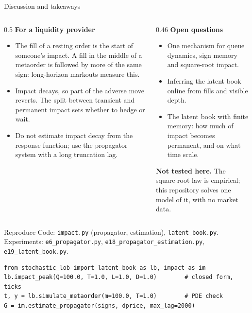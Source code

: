 \documentclass[aspectratio=169,10pt]{beamer}
\begin{document}
\begin{frame}{Discussion and takeaways}
  \small
  \begin{columns}[T]
    \begin{column}{0.5\textwidth}
      \textbf{For a liquidity provider}
      \begin{itemize}
        \item The fill of a resting order is the start of someone's impact. A fill in the middle of a metaorder is followed by more of the same sign: long-horizon markouts measure this.
        \item Impact decays, so part of the adverse move reverts. The split between transient and permanent impact sets whether to hedge or wait.
        \item Do not estimate impact decay from the response function; use the propagator system with a long truncation lag.
      \end{itemize}
    \end{column}
    \begin{column}{0.46\textwidth}
      \textbf{Open questions}
      \begin{itemize}
        \item One mechanism for queue dynamics, sign memory and square-root impact.
        \item Inferring the latent book online from fills and visible depth.
        \item The latent book with finite memory: how much of impact becomes permanent, and on what time scale.
      \end{itemize}
      \textbf{Not tested here.} The square-root law is empirical; this repository solves one model of it, with no market data.
    \end{column}
  \end{columns}
\end{frame}

\begin{frame}[fragile]{Reproduce}
  \small
  Code: \texttt{impact.py} (propagator, estimation), \texttt{latent\_book.py}. Experiments: \texttt{e6\_propagator.py}, \texttt{e18\_propagator\_estimation.py}, \texttt{e19\_latent\_book.py}.
\begin{verbatim}
from stochastic_lob import latent_book as lb, impact as im
lb.impact_peak(Q=100.0, T=1.0, L=1.0, D=1.0)        # closed form, ticks
t, y = lb.simulate_metaorder(m=100.0, T=1.0)        # PDE check
G = im.estimate_propagator(signs, dprice, max_lag=2000)
\end{verbatim}
\end{frame}

\deckreferences
\end{document}
